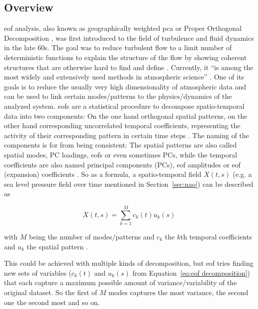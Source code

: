 \subsection{Overview}

\acf{eof} analysis, also known as geographically weighted \ac{pca} or Proper Orthogonal Decomposition \cite{vietinghoffdiss}, was first introduced to the field of turbulence and fluid dynamics in the late 60s. The goal was to reduce turbulent flow to a limit number of deterministic functions to explain the structure of the flow by showing coherent structures that are otherwise hard to find and define \cite{weiss_tutorial_2019}. Currently, it \enquote{is among the most widely and extensively used methods in atmospheric science} \cite{hannachi_empirical_2007}. 
One of its goals is to reduce the usually very high dimensionality of atmospheric data and can be used to link certain modes/patterns to the physics/dynamics of the analyzed system.  
\acp{eof} are a statistical procedure to decompose spatio-temporal data into two components: On the one hand orthogonal spatial patterns, on the other hand corresponding uncorrelated temporal coefficients, representing the activity of their corresponding pattern in certain time steps \cite{hannachi_empirical_2007, vietinghoffdiss}. 
The naming of the components is for from being consistent: The spatial patterns are also called spatial modes, PC loadings, \acp{eof} or even sometimes PCs, while the temporal coefficients are also named principal components (PCs), \ac{eof} amplitudes or \ac{eof} (expansion) coefficients \cite{hannachi_empirical_2007}. 
So as a formula, a spatio-temporal field $X(t, s)$ (e.g. a sea level pressure field over time mentioned in Section~\ref{sec:nao}) can be described as

\begin{equation}
  X(t, s) = \sum^{M}_{k=1} c_k(t) u_k(s)
  \label{eq:eof decomposition}
\end{equation}

with $M$ being the number of modes/patterns and  $c_k$ the $k$th temporal coefficients and $u_k$ the spatial pattern \cite{hannachi_empirical_2007}. 

This could be achieved with multiple kinds of decomposition, but \ac{eof} tries finding new sets of variables ($c_k(t)$ and $u_k(s)$ from Equation~\ref{eq:eof decomposition}) that each capture a maximum possible amount of variance/variability of the original dataset. 
So the first of $M$ modes captures the most variance, the second one the second most and so on. 

